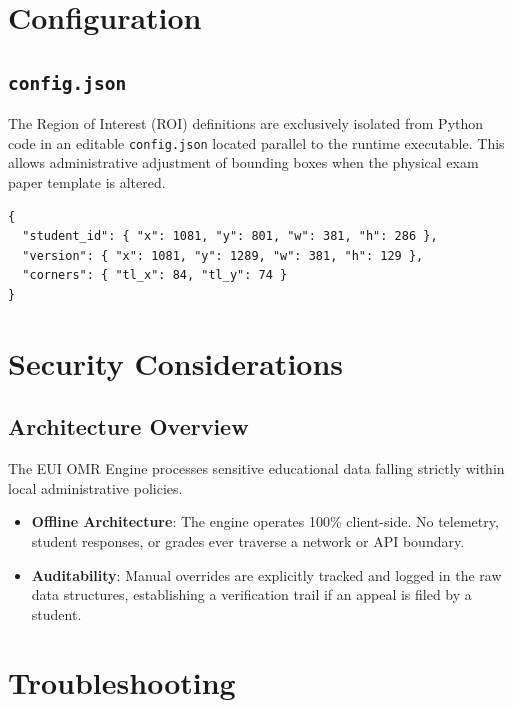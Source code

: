 \documentclass[12pt,a4paper]{article}
\begin{document}
\section{Configuration}

\subsection{\texttt{config.json}}
The Region of Interest (ROI) definitions are exclusively isolated from Python code in an editable \texttt{config.json} located parallel to the runtime executable. This allows administrative adjustment of bounding boxes when the physical exam paper template is altered.

\begin{lstlisting}
{
  "student_id": { "x": 1081, "y": 801, "w": 381, "h": 286 },
  "version": { "x": 1081, "y": 1289, "w": 381, "h": 129 },
  "corners": { "tl_x": 84, "tl_y": 74 }
}
\end{lstlisting}

\section{Security Considerations}

\subsection{Architecture Overview}
The EUI OMR Engine processes sensitive educational data falling strictly within local administrative policies. 
\begin{itemize}
    \item \textbf{Offline Architecture}: The engine operates 100\% client-side. No telemetry, student responses, or grades ever traverse a network or API boundary.
    \item \textbf{Auditability}: Manual overrides are explicitly tracked and logged in the raw data structures, establishing a verification trail if an appeal is filed by a student.
\end{itemize}

\section{Troubleshooting}
\end{document}

